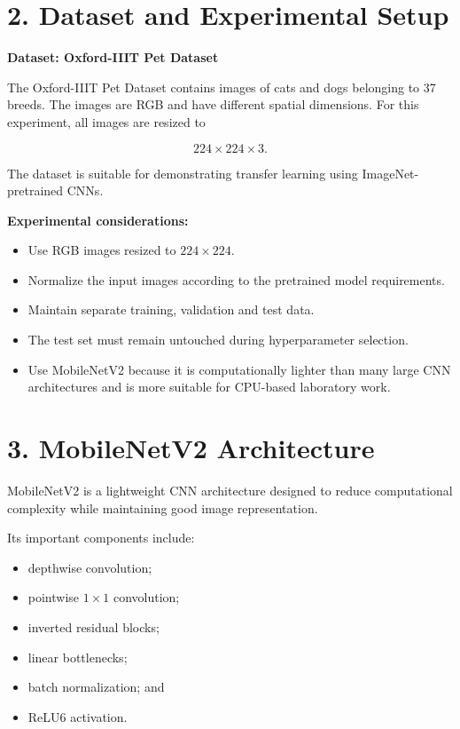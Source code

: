 \documentclass[10pt]{article}
\begin{document}
\section*{2. Dataset and Experimental Setup}

\textbf{Dataset: Oxford-IIIT Pet Dataset}

The Oxford-IIIT Pet Dataset contains images of cats and dogs belonging
to 37 breeds. The images are RGB and have different spatial dimensions.
For this experiment, all images are resized to

\[
224\times224\times3.
\]

The dataset is suitable for demonstrating transfer learning using
ImageNet-pretrained CNNs.

\textbf{Experimental considerations:}

\begin{itemize}
\item Use RGB images resized to $224\times224$.
\item Normalize the input images according to the pretrained model requirements.
\item Maintain separate training, validation and test data.
\item The test set must remain untouched during hyperparameter selection.
\item Use MobileNetV2 because it is computationally lighter than many
large CNN architectures and is more suitable for CPU-based laboratory work.
\end{itemize}

\section*{3. MobileNetV2 Architecture}

MobileNetV2 is a lightweight CNN architecture designed to reduce
computational complexity while maintaining good image representation.

Its important components include:

\begin{itemize}
\item depthwise convolution;
\item pointwise $1\times1$ convolution;
\item inverted residual blocks;
\item linear bottlenecks;
\item batch normalization; and
\item ReLU6 activation.
\end{itemize}
\end{document}
